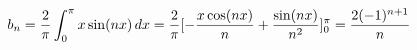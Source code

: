 \documentclass[preview]{standalone}
\begin{document}
\begin{align*}
\special{dvisvgm:raw <g id='unique000'>}b_n=\frac{2}{\pi}\int_0^\pi x\sin(nx)\,dx=\frac{2}{\pi}[-\frac{x\cos(nx)}{n}+\frac{\sin(nx)}{n^2}]_0^\pi=\frac{2(-1)^{n+1}}{n}\special{dvisvgm:raw </g>}
\end{align*}
\end{document}
